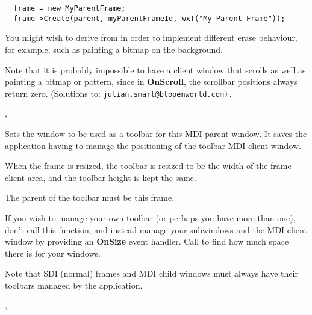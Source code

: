\begin{verbatim}
  frame = new MyParentFrame;
  frame->Create(parent, myParentFrameId, wxT("My Parent Frame"));
\end{verbatim}


You might wish to derive from  in order
to implement different erase behaviour, for example, such as painting a bitmap
on the background.

Note that it is probably impossible to have a client window that scrolls as well as painting
a bitmap or pattern, since in {\bf OnScroll}, the scrollbar positions always return zero.
(Solutions to: \tt{julian.smart@btopenworld.com}).


,\rtfsp
{}

\label{wxmdiparentframesettoolbar}


Sets the window to be used as a toolbar for this
MDI parent window. It saves the application having to manage the positioning
of the toolbar MDI client window.




When the frame is resized, the toolbar is resized to be the width of
the frame client area, and the toolbar height is kept the same.

The parent of the toolbar must be this frame.

If you wish to manage your own toolbar (or perhaps you have more than one),
don't call this function, and instead manage your subwindows and the MDI client window by
providing an {\bf OnSize} event handler. Call  to
find how much space there is for your windows.

Note that SDI (normal) frames and MDI child windows must always have their
toolbars managed by the application.


,\rtfsp
{}

